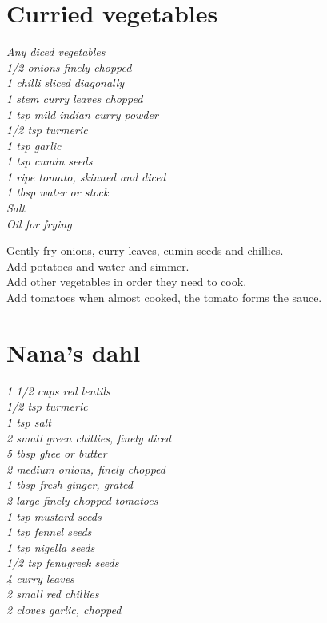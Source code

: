 \documentclass{tufte-book}
\begin{document}
\section{Curried vegetables}

\emph{Any diced vegetables
\\1/2 onions finely chopped
\\1 chilli sliced diagonally
\\1 stem curry leaves chopped
\\1 tsp mild indian curry powder
\\1/2 tsp turmeric
\\1 tsp garlic
\\1 tsp cumin seeds
\\1 ripe tomato, skinned and diced
\\1 tbsp water or stock
\\Salt
\\Oil for frying}

Gently fry onions, curry leaves, cumin seeds and chillies.
\\Add potatoes and water and simmer.
\\Add other vegetables in order they need to cook.
\\Add tomatoes when almost cooked, the tomato forms the sauce.


\section{Nana's dahl}

\emph{1 1/2 cups red lentils
\\1/2 tsp turmeric
\\1 tsp salt
\\2 small green chillies, finely diced
\\5 tbsp ghee or butter
\\2 medium onions, finely chopped
\\1 tbsp fresh ginger, grated
\\2 large finely chopped tomatoes
\\1 tsp mustard seeds
\\1 tsp fennel seeds
\\1 tsp nigella seeds
\\1/2 tsp fenugreek seeds
\\4 curry leaves
\\2 small red chillies
\\2 cloves garlic, chopped}
\end{document}

